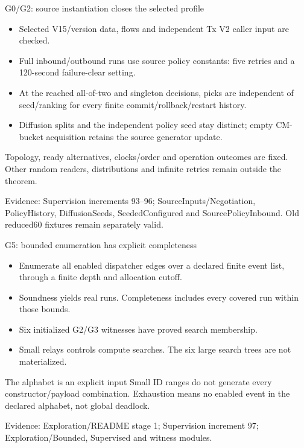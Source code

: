 \documentclass[11pt,aspectratio=169]{beamer}
\newcommand{\evidence}[1]{\vfill{\fontsize{7}{8}\selectfont\color{Muted}Evidence: #1\par}}
\begin{document}
\begin{frame}{G0/G2: source instantiation closes the selected profile}
\begin{itemize}\setlength\itemsep{2.5mm}
\item Selected V15/version data, flows and independent Tx V2 caller input are checked.
\item Full inbound/outbound runs use source policy constants: five retries and a 120-second failure-clear setting.
\item At the reached all-of-two and singleton decisions, picks are independent of seed/ranking for every finite commit/rollback/restart history.
\item Diffusion splits and the independent policy seed stay distinct; empty CM-bucket acquisition retains the source generator update.
\end{itemize}\small Topology, ready alternatives, clocks/order and operation outcomes are fixed. Other random readers, distributions and infinite retries remain outside the theorem.
\evidence{Supervision increments 93--96; SourceInputs/Negotiation, PolicyHistory, DiffusionSeeds, SeededConfigured and SourcePolicyInbound. Old reduced60 fixtures remain separately valid.}
\end{frame}

\begin{frame}{G5: bounded enumeration has explicit completeness}
\begin{itemize}\setlength\itemsep{2.5mm}
\item Enumerate all enabled dispatcher edges over a declared finite event list, through a finite depth and allocation cutoff.
\item Soundness yields real runs. Completeness includes every covered run within those bounds.
\item Six initialized G2/G3 witnesses have proved search membership.
\item Small relays controls compute searches. The six large search trees are not materialized.
\end{itemize}\begin{alertblock}{The alphabet is an explicit input}
Small ID ranges do not generate every constructor/payload combination. Exhaustion means no enabled event in the declared alphabet, not global deadlock.
\end{alertblock}
\evidence{Exploration/README stage 1; Supervision increment 97; Exploration/Bounded, Supervised and witness modules.}
\end{frame}
\end{document}
